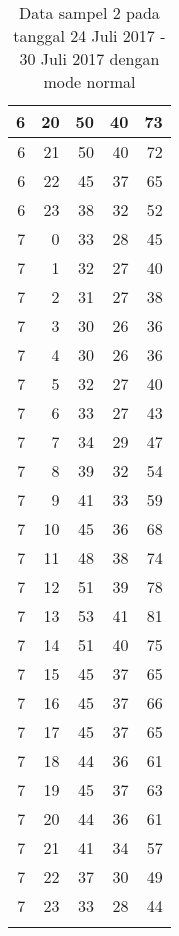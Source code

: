 \begin{longtable}{|r|r|r|r|r|}
    \hline
    6     & 20    & 50    & 40    & 73 \\
    \hline
    6     & 21    & 50    & 40    & 72 \\
    \hline
    6     & 22    & 45    & 37    & 65 \\
    \hline
    6     & 23    & 38    & 32    & 52 \\
    \hline
    7     & 0     & 33    & 28    & 45 \\
    \hline
    7     & 1     & 32    & 27    & 40 \\
    \hline
    7     & 2     & 31    & 27    & 38 \\
    \hline
    7     & 3     & 30    & 26    & 36 \\
    \hline
    7     & 4     & 30    & 26    & 36 \\
    \hline
    7     & 5     & 32    & 27    & 40 \\
    \hline
    7     & 6     & 33    & 27    & 43 \\
    \hline
    7     & 7     & 34    & 29    & 47 \\
    \hline
    7     & 8     & 39    & 32    & 54 \\
    \hline
    7     & 9     & 41    & 33    & 59 \\
    \hline
    7     & 10    & 45    & 36    & 68 \\
    \hline
    7     & 11    & 48    & 38    & 74 \\
    \hline
    7     & 12    & 51    & 39    & 78 \\
    \hline
    7     & 13    & 53    & 41    & 81 \\
    \hline
    7     & 14    & 51    & 40    & 75 \\
    \hline
    7     & 15    & 45    & 37    & 65 \\
    \hline
    7     & 16    & 45    & 37    & 66 \\
    \hline
    7     & 17    & 45    & 37    & 65 \\
    \hline
    7     & 18    & 44    & 36    & 61 \\
    \hline
    7     & 19    & 45    & 37    & 63 \\
    \hline
    7     & 20    & 44    & 36    & 61 \\
    \hline
    7     & 21    & 41    & 34    & 57 \\
    \hline
    7     & 22    & 37    & 30    & 49 \\
    \hline
    7     & 23    & 33    & 28    & 44 \\
    \hline
  \caption{Data sampel 2 pada tanggal 24 Juli 2017 - 30 Juli 2017 dengan mode normal}
  \label{tab:datasample224072017normal}%
\end{longtable}%

